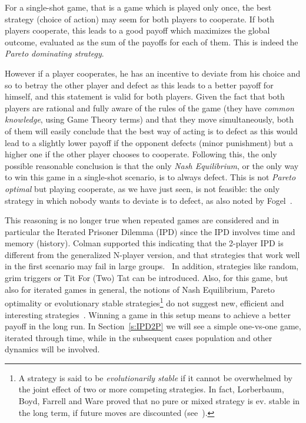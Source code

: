 \documentclass[journal,a4paper,10pt,twoside]{IEEEtran} %
\begin{document}
For a single-shot game, that is a game which is played only once, the best strategy (choice of action) may seem for both players to cooperate. If both players cooperate, this leads to a good payoff which maximizes the global outcome, evaluated as the sum of the payoffs for each of them. This is indeed the \textit{Pareto dominating strategy}.

However if a player cooperates, he has an incentive to deviate from his choice and so to betray the other player and defect as this leads to a better payoff for himself, and this statement is valid for both players. 
Given the fact that both players are rational and fully aware of the rules of the game (they have \textit{common knowledge}, using Game Theory terms) and that they move simultaneously, both of them will easily conclude that the best way of acting is to defect as this would lead to a slightly lower payoff if the opponent defects (minor punishment) but a higher one if the other player chooses to cooperate.
Following this, the only possible reasonable conclusion is that the only \textit{Nash Equilibrium}, or the only way to win this game in a single-shot scenario, is to always defect.
This is not \textit{Pareto optimal} but playing cooperate, as we have just seen, is not feasible: the only strategy in which nobody wants to deviate is to defect, as also noted by Fogel~\cite{fogelEvolvingBehaviors}.

This reasoning is no longer true when repeated games are considered and in particular the Iterated Prisoner Dilemma (IPD) since the IPD involves time and memory (history).
Colman supported this indicating that the 2-player IPD is different from the generalized N-player version, and that strategies that work well in the first scenario may fail in large groups.~\cite{yao1994experimental}
In addition, strategies like random, grim triggers or Tit For (Two) Tat can be introduced.
Also, for this game, but also for iterated games in general, the notions of Nash Equilibrium, Pareto optimality or evolutionary stable strategies\footnote{A strategy is said to be \textit{evolutionarily stable} if it cannot be overwhelmed by the joint effect of two or more competing strategies. In fact, Lorberbaum, Boyd, Farrell and Ware proved that no pure or mixed strategy is ev. stable in the long term, if future moves are discounted (see~\cite{lorb94}).} do not suggest new, efficient and interesting strategies~\cite{mathieu2017}.
Winning a game in this setup means to achieve a better payoff in the long run. In Section~\ref{s:IPD2P} we will see a simple one-vs-one game, iterated through time, while in the subsequent cases population and other dynamics will be involved.
\end{document}
